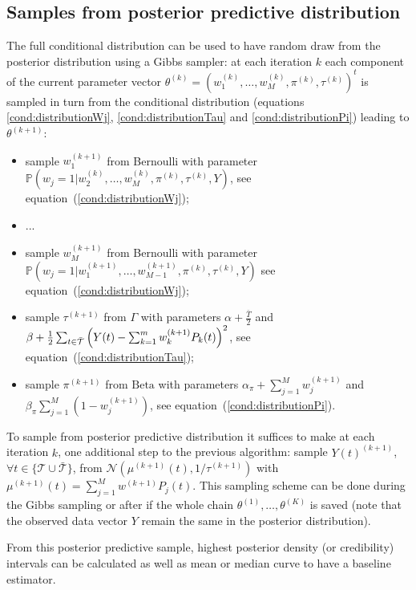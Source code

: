 \documentclass[journal]{IEEEtran}
\begin{document}
\subsection{Samples from posterior predictive distribution}
The full conditional distribution can be used to have random draw from
the posterior distribution using a Gibbs sampler: at each iteration
$k$ each component of the current parameter vector
$\theta^{(k)}=(w_1^{(k)},\dotsc,w_M^{(k)},\pi^{(k)},\tau^{(k)})^t$ is
sampled in turn from the conditional distribution (equations
\ref{cond:distributionWj}, \ref{cond:distributionTau} and
\ref{cond:distributionPi}) leading to $\theta^{(k+1)}$:
\begin{itemize}
\item sample $w_1^{(k+1)}$ from Bernoulli with parameter
  ${\mathbb P}(w_j = 1 |
  w_2^{(k)},\dotsc,w_M^{(k)},\pi^{(k)},\tau^{(k)},Y)$, see
  equation~(\ref{cond:distributionWj});
\item ...
\item sample $w_M^{(k+1)}$ from Bernoulli with parameter
  ${\mathbb P}(w_j = 1 |
  w_1^{(k+1)},\dotsc,w_{M-1}^{(k+1)},\pi^{(k)},\tau^{(k)},Y)$ see
  equation~(\ref{cond:distributionWj});
\item sample $\tau^{(k+1)}$ from $\Gamma$ with parameters
  $\alpha+\frac{\bar T}{2}$ and
  $\beta + \frac{1}{2}\sum_{t\in \bar{\mathcal{T}}}{\Bigl(Y(t) -
    \sum_{k=1}^m w^{(k+1)}_k P_k(t)\Bigr)^2}$, see
  equation~(\ref{cond:distributionTau});
\item sample $\pi^{(k+1)}$ from $\mathrm{Beta}$ with parameters
  $\alpha_\pi+\sum_{j=1}^{M}{w^{(k+1)}_j} $ and
  $\beta_\pi\sum_{j=1}^{M}{(1-w^{(k+1)}_j)}$, see
  equation~(\ref{cond:distributionPi}).
\end{itemize}
To sample from posterior predictive distribution it suffices to make
at each iteration $k$, one additional step to the previous algorithm:
sample $Y(t)^{(k+1)}$, $\forall t\in \{\mathcal{T} \cup
\bar{\mathcal{T}}\}$, from
$\mathcal{N}(\mu^{(k+1)}(t),1/\tau^{(k+1)})$ with
$\mu^{(k+1)}(t)=\sum_{j=1}^{M}{w^{(k+1)}P_j(t)}$. This sampling scheme
can be done during the Gibbs sampling or after if the whole chain
$\theta^{(1)},\dotsc,\theta^{(K)}$ is saved (note that the observed
data vector $Y$ remain the same in the posterior distribution).

From this posterior predictive sample, highest posterior density (or
credibility) intervals can be calculated as well as mean or median
curve to have a baseline estimator.
\end{document}
